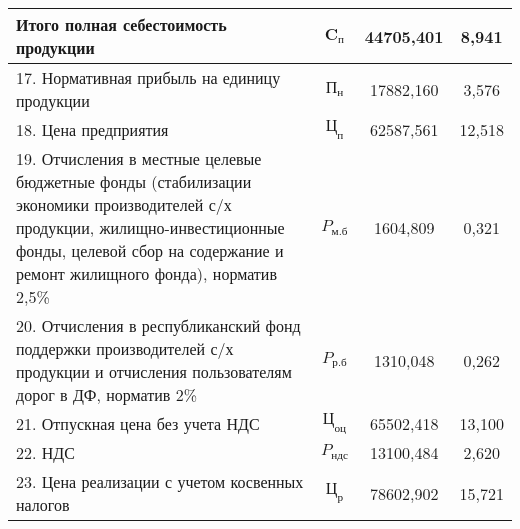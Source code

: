 {\begin{longtable}{| m{10.7cm} | c | c | c |}
      \textbf{Итого \newline полная себестоимость продукции}
      & \( \mathbf{C_{\text{п}}} \) & \textbf{44705{,}401} & \textbf{8{,}941} \\
      \hline

      17. Нормативная прибыль на единицу продукции
      & \( \text{П}_{\text{н}} \) & 17882{,}160 & 3{,}576 \\
      \hline

      18. Цена предприятия
      & \( \mathbf{\text{Ц}_{\text{п}}} \) & 62587{,}561 & 12{,}518 \\
      \hline

      19. Отчисления в местные целевые бюджетные фонды \newline
      (стабилизации экономики производителей с/х продукции, \newline
      жилищно-инвестиционные фонды, целевой сбор на \newline
      содержание и ремонт жилищного фонда),
      норматив 2{,}5\%
      & \( P_{\text{м.б}} \) & 1604{,}809 & 0{,}321 \\
      \hline

      20. Отчисления в республиканский фонд поддержки \newline
      производителей с/х продукции и отчисления \newline
      пользователям дорог в ДФ, норматив 2\%
      & \( P_{\text{р.б}} \) & 1310{,}048 & 0{,}262 \\
      \hline

      21. Отпускная цена без учета НДС
      & \( \text{Ц}_{\text{оц}} \) & 65502{,}418 & 13{,}100 \\
      \hline

      22. НДС
      & \( P_{\text{ндс}} \) & 13100{,}484 & 2{,}620 \\
      \hline

      23. Цена реализации с учетом косвенных налогов
      & \( \text{Ц}_{\text{р}} \) & 78602{,}902 & 15{,}721 \\
      \hline 
\end{longtable}
}
